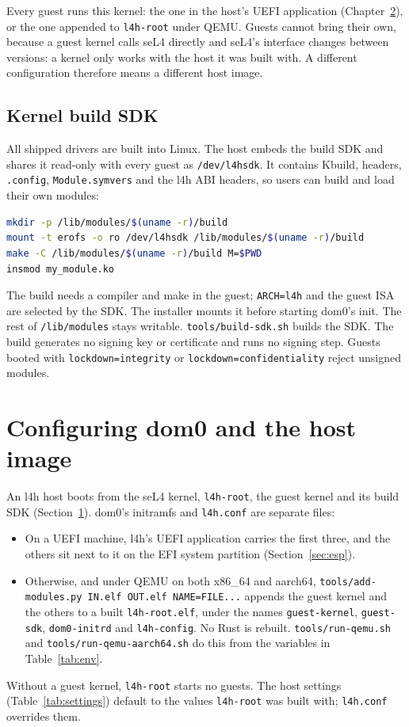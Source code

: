 \documentclass[11pt,a4paper]{report}
\newcommand{\cmd}[1]{\texttt{#1}}
\newcommand{\file}[1]{\texttt{#1}}
\begin{document}
Every guest runs this kernel: the one in the host's UEFI application
(Chapter~\ref{ch:dom0}), or the one appended to \texttt{l4h-root} under
QEMU. Guests cannot bring their own, because a guest kernel calls seL4
directly and seL4's interface changes between versions: a kernel only works
with the host it was built with. A different configuration therefore means a
different host image.

\section{Kernel build SDK}
\label{sec:sdk}

All shipped drivers are built into Linux. The host embeds the build SDK
and shares it read-only with every guest as \file{/dev/l4hsdk}. It contains
Kbuild, headers, \file{.config}, \file{Module.symvers} and the l4h ABI
headers, so users can build and load their own modules:
\begin{lstlisting}[language=bash]
mkdir -p /lib/modules/$(uname -r)/build
mount -t erofs -o ro /dev/l4hsdk /lib/modules/$(uname -r)/build
make -C /lib/modules/$(uname -r)/build M=$PWD
insmod my_module.ko
\end{lstlisting}
The build needs a compiler and make in the guest; \texttt{ARCH=l4h} and
the guest ISA are selected by the SDK. The installer mounts it before
starting dom0's init. The rest of \file{/lib/modules} stays writable.
\cmd{tools/build-sdk.sh} builds the SDK. The build generates no signing
key or certificate and runs no signing step. Guests booted with
\texttt{lockdown=integrity} or \texttt{lockdown=confidentiality} reject
unsigned modules.

\chapter{Configuring dom0 and the host image}
\label{ch:dom0}

An l4h host boots from the seL4 kernel, \texttt{l4h-root}, the guest
kernel and its build SDK (Section~\ref{sec:sdk}). dom0's initramfs and
\file{l4h.conf} are separate files:
\begin{itemize}
  \item On a UEFI machine, l4h's UEFI application carries the first three,
        and the others sit next to it on the EFI system partition
        (Section~\ref{sec:esp}).
  \item Otherwise, and under QEMU on both x86\_64 and aarch64,
        \cmd{tools/add-modules.py IN.elf OUT.elf NAME=FILE...} appends
        the guest kernel and the others to a built \file{l4h-root.elf},
        under the names \texttt{guest-kernel}, \texttt{guest-sdk},
        \texttt{dom0-initrd} and \texttt{l4h-config}. No Rust is rebuilt.
        \cmd{tools/run-qemu.sh} and \cmd{tools/run-qemu-aarch64.sh} do
        this from the variables in Table~\ref{tab:env}.
\end{itemize}
Without a guest kernel, \texttt{l4h-root} starts no guests.
The host settings (Table~\ref{tab:settings}) default to the values
\texttt{l4h-root} was built with; \file{l4h.conf} overrides them.
\end{document}
